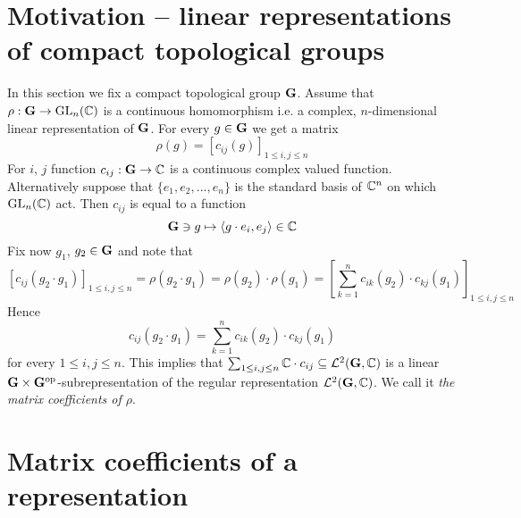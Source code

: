 \section{Motivation -- linear representations of compact topological groups}
\noindent
In this section we fix a compact topological group $\mathbf{G}$.
Assume that $\rho:\mathbf{G}\rightarrow \mathrm{GL}_n({\mathbb C})$ is a continuous homomorphism i.e. a complex, $n$-dimensional linear representation of $\mathbf{G}$. For every $g\in \mathbf{G}$ we get a matrix
$$\rho(g)=\left[c_{ij}(g)\right]_{1\leq i, j \leq n}$$
For $i$, $j$ function $c_{ij}:\mathbf{G}\rightarrow {\mathbb C}$ is a continuous complex valued function. Alternatively suppose that $\{e_1,e_2,...,e_n\}$ is the standard basis of ${\mathbb C}^n$ on which $\mathrm{GL}_n({\mathbb C})$ act. Then $c_{ij}$ is equal to a function 
$$\mathbf{G}\ni g \mapsto \langle g\cdot e_i, e_j\rangle \in {\mathbb C}$$
Fix now $g_1$, $g_2\in \mathbf{G}$ and note that
$$\left[c_{ij}(g_2\cdot g_1)\right]_{1\leq i,j\leq n}  = \rho(g_2\cdot g_1) = \rho(g_2)\cdot \rho(g_1) = \left[\sum_{k=1}^nc_{ik}(g_2)\cdot c_{kj}(g_1)\right]_{1\leq i,j\leq n}$$
Hence 
$$c_{ij}(g_2\cdot g_1) = \sum_{k=1}^nc_{ik}(g_2)\cdot c_{kj}(g_1)$$
for every $1\leq i,j\leq n$. This implies that $\sum_{1\leq i,j\leq n}{\mathbb C}\cdot c_{ij}\subseteq {\mathcal L}^2(\mathbf{G},{\mathbb C})$ is a linear $\mathbf{G}\times \mathbf{G}^{\mathrm{op}}$-subrepresentation of the regular representation ${\mathcal L}^2(\mathbf{G},{\mathbb C})$. We call it \textit{the matrix coefficients of $\rho$}. 

\section{Matrix coefficients of a representation}

